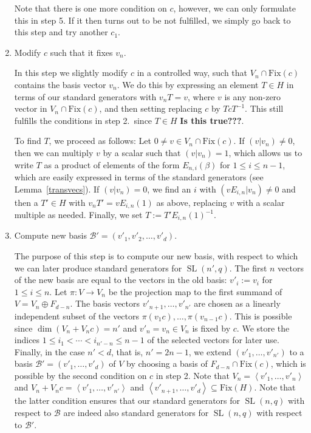 \documentclass[a4paper,11pt]{article}
\def\SL{\operatorname{SL}}
\newcommand{\Fix}[1]{\mathrm{Fix}(#1)}
\newcommand{\fixme}[1]{\textbf{#1}}
\newcommand{\B}{\mathcal{B}}
\begin{document}
\begin{enumerate}
Note that there is one more condition on $c$, however, we can only
formulate this in step 5. If it then turns out to be not fulfilled,
we simply go back to this step and try another $c_1$.
\item Modify $c$ such that it fixes $v_n$.

In this step we slightly modify $c$ in a controlled way, such that
$V_n \cap \Fix c$ contains the basis vector $v_n$. We do this by expressing
an element $T \in H$ in terms of our standard generators with $v_nT
= v$, where $v$ is any non-zero vector in $V_n \cap \Fix c$,
and then setting replacing $c$ by $Tc T^{-1}$. This still fulfills
the conditions in step 2.~since $T \in H$ \fixme{Is this true???}.

To find $T$, we proceed as follows: Let $0 \neq v \in V_n \cap \Fix c$.
If $(v|v_n) \neq 0$, then we can multiply $v$ by a scalar such that
$(v | v_n) = 1$, which allows us to write $T$ as a product of
elements of the form $E_{n,i}(\beta)$ for $1 \le i \le n-1$, 
which are easily expressed
in terms of the standard generators (see Lemma~\ref{transvecs}). 
If $(v|v_n) = 0$, we find an $i$ with $(vE_{i,n}|v_n) \neq 0$ and
then a $T' \in H$ with $v_n T' = vE_{i,n}(1)$ as above,
replacing $v$ with a scalar multiple as needed. Finally, we set
$T := T' E_{i,n}(1)^{-1}$.
\item Compute new basis $\B' = (v'_1,v'_2,\ldots,v'_d)$.

The purpose of this step is to compute our new basis, with respect to
which we can later produce standard generators for $\SL(n',q)$.
The first $n$ vectors of the new basis are equal to the vectors in
the old basis: $v'_i := v_i$ for $1 \le i \le n$.
Let $\pi: V \to V_n$ be the projection map to the first summand of
$V = V_n \oplus F_{d-n}$. The basis vectors
$v'_{n+1}, \ldots, v'_{n'}$ are chosen as a linearly independent subset
of the vectors $\pi(v_1c), \ldots, \pi(v_{n-1}c)$. This is possible
since $\dim(V_n + V_n c) = n'$ and $v'_n=v_n \in V_n$ is fixed by $c$.
We store the indices $1 \le i_1 < \cdots < i_{n'-n} \le n-1$ of the
selected vectors for later use. Finally, in the case $n' < d$, that is,
$n'=2n-1$, we extend $(v'_1, \ldots, v'_{n'})$ to a basis $\B' = (v'_1,
\ldots, v'_d)$ of $V$ by choosing a basis of $F_{d-n} \cap \Fix c$, which
is possible by the second condition on $c$ in step 2. Note that $V_n =
\left< v'_1, \ldots, v'_n\right>$ and $V_n + V_nc = \left< v'_1, \ldots,
v'_{n'}\right>$ and $\left< v'_{n+1}, \ldots, v'_d\right> \subseteq \Fix
H$. Note that the latter condition ensures that our standard generators
for $\SL(n,q)$ with respect to $\B$ are indeed also standard generators
for $\SL(n,q)$ with respect to $\B'$.


\end{enumerate}
\end{document}
